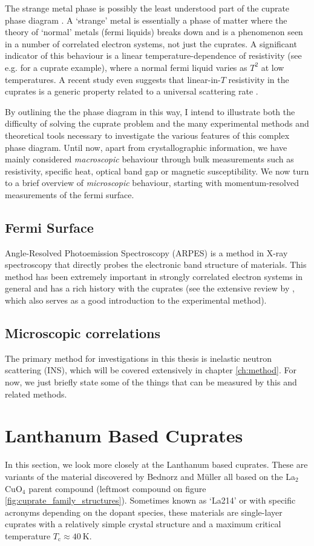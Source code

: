 The strange metal phase is possibly the least understood part of the cuprate phase diagram \cite{Keimer2015}. A `strange' metal is essentially a phase of matter where the theory of `normal' metals (fermi liquids) breaks down and is a phenomenon seen in a number of correlated electron systems, not just the cuprates. A significant indicator of this behaviour is a linear temperature-dependence of resistivity (see e.g. \cite{Martin1990} for a cuprate example), where a normal fermi liquid varies as $T^2$ at low temperatures. A recent study even suggests that linear-in-$T$ resistivity in the cuprates is a generic property related to a universal scattering rate \cite{Legros2018}.

By outlining the the phase diagram in this way, I intend to illustrate both the difficulty of solving the cuprate problem and the many experimental methods and theoretical tools necessary to investigate the various features of this complex phase diagram. Until now, apart from crystallographic information, we have mainly considered \emph{macroscopic} behaviour through bulk measurements such as resistivity, specific heat, optical band gap or magnetic susceptibility. We now turn to a brief overview of \emph{microscopic} behaviour, starting with momentum-resolved measurements of the fermi surface.

\subsection{Fermi Surface}
Angle-Resolved Photoemission Spectroscopy (ARPES) is a method in X-ray spectroscopy that directly probes the electronic band structure of materials. This method has been extremely important in strongly correlated electron systems in general and has a rich history with the cuprates (see the extensive review by \citeauthor{Damascelli2003} \cite{Damascelli2003}, which also serves as a good introduction to the experimental method).

\subsection{Microscopic correlations}
The primary method for investigations in this thesis is inelastic neutron scattering (INS), which will be covered extensively in chapter \ref{ch:method}. For now, we just briefly state some of the things that can be measured by this and related methods.

\section{Lanthanum Based Cuprates}\label{sec:lsco}
In this section, we look more closely at the Lanthanum based cuprates. These are variants of the material discovered by Bednorz and M\"uller all based on the La$_2$CuO$_4$ parent compound (leftmost compound on figure \ref{fig:cuprate_family_structures}). Sometimes known as `La214' or with specific acronyms depending on the dopant species, these materials are single-layer cuprates with a relatively simple crystal structure and a maximum critical temperature $T_\text{c} \approx \SI{40}{\kelvin}$.

